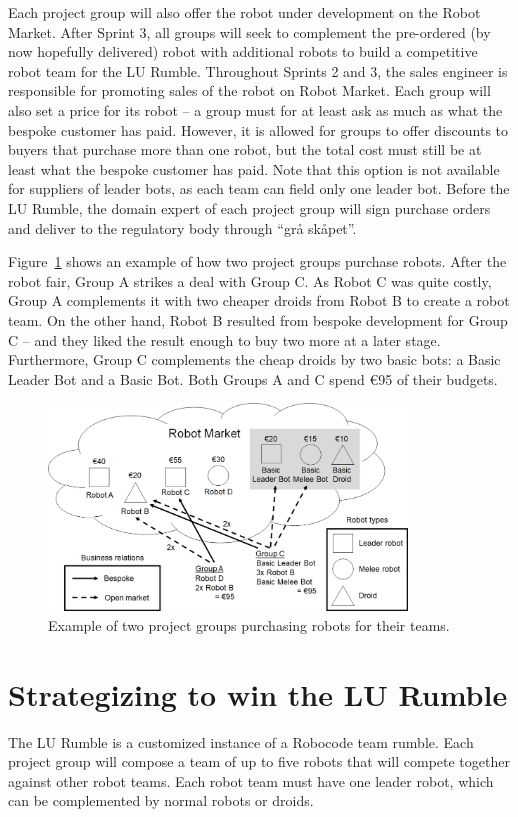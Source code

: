 \documentclass{scrreprt}
\begin{document}
Each project group will also offer the robot under development on the Robot Market. After Sprint 3, all groups will seek to complement the pre-ordered (by now hopefully delivered) robot with additional robots to build a competitive robot team for the LU Rumble. Throughout Sprints 2 and 3, the sales engineer is responsible for promoting sales of the robot on Robot Market. Each group will also set a price for its robot -- a group must for at least ask as much as what the bespoke customer has paid. However, it is allowed for groups to offer discounts to buyers that purchase more than one robot, but the total cost must still be at least what the bespoke customer has paid. Note that this option is not available for suppliers of leader bots, as each team can field only one leader bot. Before the LU Rumble, the domain expert of each project group will sign purchase orders and deliver to the regulatory body through ``grå skåpet''. 

Figure~\ref{fig:market} shows an example of how two project groups purchase robots. After the robot fair, Group A strikes a deal with Group C. As Robot C was quite costly, Group A complements it with two cheaper droids from Robot B to create a robot team. On the other hand, Robot B resulted from bespoke development for Group C -- and they liked the result enough to buy two more at a later stage. Furthermore, Group C complements the cheap droids by two basic bots: a Basic Leader Bot and a Basic Bot. Both Groups A and C spend \euro95 of their budgets.

\begin{figure}
\centering
\includegraphics[width=0.85\textwidth]{figures/marketExample.png}
\caption{Example of two project groups purchasing robots for their teams.}
\label{fig:market}
\end{figure}

\section{Strategizing to win the LU Rumble}
The LU Rumble is a customized instance of a Robocode team rumble. Each project group will compose a team of up to five robots that will compete together against other robot teams. Each robot team must have one leader robot, which can be complemented by normal robots or droids.
\end{document}
